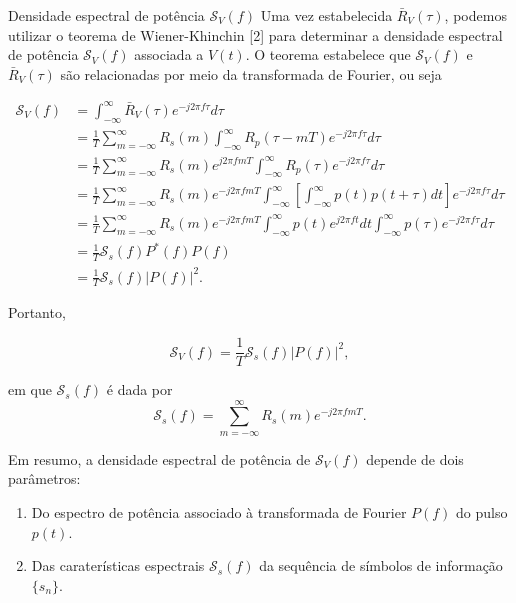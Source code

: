 \documentclass[
  ignorenonframetext,
]{beamer}
\providecommand{\tightlist}{%
  \setlength{\itemsep}{0pt}\setlength{\parskip}{0pt}}
\begin{document}
\begin{frame}{Densidade espectral de potência \(\mathcal{S}_{V}(f)\)}
\label{densidade-espectral-de-potuxeancia-mathcals_vf}
Uma vez estabelecida \(\bar{R}_{V}(\tau)\), podemos utilizar o teorema
de Wiener-Khinchin {[}2{]} para determinar a densidade espectral de
potência \(\mathcal{S}_{V}(f)\) associada a \(V(t)\). O teorema
estabelece que \(\mathcal{S}_{V}(f)\) e \(\bar{R}_{V}(\tau)\) são
relacionadas por meio da transformada de Fourier, ou seja

\begin{equation}
\begin{aligned}
\mathcal{S}_{V}(f) &=\int_{-\infty}^{\infty} \bar{R}_{V}(\tau) e^{-j 2 \pi f \tau} d \tau \\
&=\frac{1}{T} \sum_{m=-\infty}^{\infty} R_{s}(m) \int_{-\infty}^{\infty} R_{p}(\tau-m T) e^{-j 2 \pi f \tau} d \tau \\
&=\frac{1}{T} \sum_{m=-\infty}^{\infty} R_{s}(m) e^{j 2 \pi f m T}\int_{-\infty}^{\infty} R_{p}(\tau) e^{-j 2 \pi f \tau} d \tau \\
&=\frac{1}{T} \sum_{m=-\infty}^{\infty} R_{s}(m) e^{-j 2 \pi f m T}\int_{-\infty}^{\infty} \left[\int_{-\infty}^{\infty} p(t) p(t+\tau) d t\right] e^{-j 2 \pi f \tau} d \tau \\
&=\frac{1}{T} \sum_{m=-\infty}^{\infty} R_{s}(m) e^{-j 2 \pi f m T}\int_{-\infty}^{\infty}p(t) e^{j 2 \pi f t}dt\int_{-\infty}^{\infty}p(\tau)e^{-j 2 \pi f \tau} d \tau \\
&=\frac{1}{T} \mathcal{S}_{s}(f)P^*(f)P(f) \\
&=\frac{1}{T} \mathcal{S}_{s}(f)\left|P(f)\right|^{2}.
\end{aligned}
\end{equation}

Portanto,

\begin{equation}
\mathcal{S}_{V}(f) = \frac{1}{T} \mathcal{S}_{s}(f)\left|P(f)\right|^{2},
\end{equation}

em que \(\mathcal{S}_{s}(f)\) é dada por \begin{equation}
\mathcal{S}_{s}(f)=\sum_{m=-\infty}^{\infty} R_{s}(m) e^{-j 2 \pi f m T}.
\end{equation}

Em resumo, a densidade espectral de potência de \(\mathcal{S}_{V}(f)\)
depende de dois parâmetros:

\begin{enumerate}
\tightlist
\item
  Do espectro de potência associado à transformada de Fourier \(P(f)\)
  do pulso \(p(t)\).
\item
  Das caraterísticas espectrais \(\mathcal{S}_{s}(f)\) da sequência de
  símbolos de informação \(\{s_n\}\).
\end{enumerate}


\end{frame}
\end{document}
